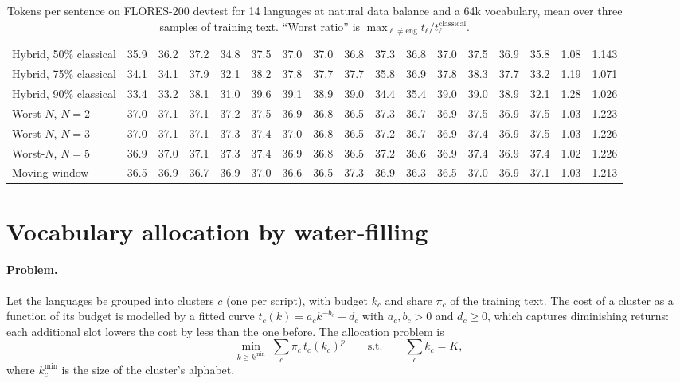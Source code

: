 \begin{table}[t]
{\begin{tabular}{lcccccccccccccccc}
Hybrid, 50\% classical & 35.9 & 36.2 & 37.2 & 34.8 & 37.5 & 37.0 & 37.0 & 36.8 & 37.3 & 36.8 & 37.0 & 37.5 & 36.9 & 35.8 & 1.08 & 1.143\\
Hybrid, 75\% classical & 34.1 & 34.1 & 37.9 & 32.1 & 38.2 & 37.8 & 37.7 & 37.7 & 35.8 & 36.9 & 37.8 & 38.3 & 37.7 & 33.2 & 1.19 & 1.071\\
Hybrid, 90\% classical & 33.4 & 33.2 & 38.1 & 31.0 & 39.6 & 39.1 & 38.9 & 39.0 & 34.4 & 35.4 & 39.0 & 39.0 & 38.9 & 32.1 & 1.28 & 1.026\\
Worst-$N$, $N=2$ & 37.0 & 37.1 & 37.1 & 37.2 & 37.5 & 36.9 & 36.8 & 36.5 & 37.3 & 36.7 & 36.9 & 37.5 & 36.9 & 37.5 & 1.03 & 1.223\\
Worst-$N$, $N=3$ & 37.0 & 37.1 & 37.1 & 37.3 & 37.4 & 37.0 & 36.8 & 36.5 & 37.2 & 36.7 & 36.9 & 37.4 & 36.9 & 37.5 & 1.03 & 1.226\\
Worst-$N$, $N=5$ & 36.9 & 37.0 & 37.1 & 37.3 & 37.4 & 36.9 & 36.8 & 36.5 & 37.2 & 36.6 & 36.9 & 37.4 & 36.9 & 37.4 & 1.02 & 1.226\\
Moving window & 36.5 & 36.9 & 36.7 & 36.9 & 37.0 & 36.6 & 36.5 & 37.3 & 36.9 & 36.3 & 36.5 & 37.0 & 36.9 & 37.1 & 1.03 & 1.213\\
\bottomrule
\end{tabular}}
\caption{Tokens per sentence on FLORES-200 devtest for 14 languages at natural data
balance and a 64k vocabulary, mean over three samples of training text. ``Worst ratio'' is
$\max_{\ell\neq\mathrm{eng}} t_\ell/t_\ell^{\mathrm{classical}}$.}
\label{tab:multilang}
\end{table}

\section{Vocabulary allocation by water-filling}
\label{app:alloc}

\paragraph{Problem.}
Let the languages be grouped into clusters $c$ (one per script), with budget $k_c$ and
share $\pi_c$ of the training text. The cost of a cluster as a function of its budget is
modelled by a fitted curve $t_c(k)=a_c k^{-b_c}+d_c$ with $a_c,b_c>0$ and $d_c\ge 0$, which
captures diminishing returns: each additional slot lowers the cost by less than the one
before. The allocation problem is
\begin{equation}
  \min_{k\ge k^{\min}}\; \sum_c \pi_c\, t_c(k_c)^{p}
  \qquad\text{s.t.}\qquad \sum_c k_c = K,
  \label{eq:alloc-app}
\end{equation}
where $k^{\min}_c$ is the size of the cluster's alphabet.

